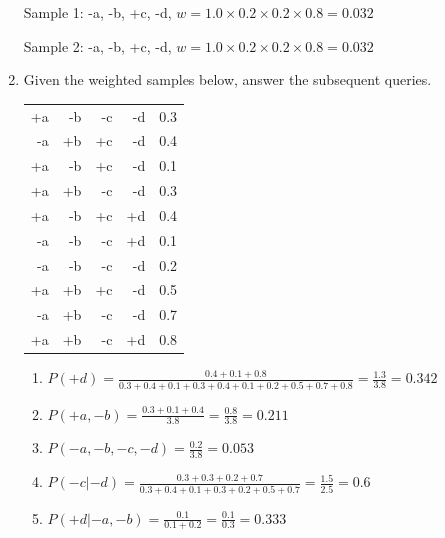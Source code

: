 \documentclass[12pt]{article}
\begin{document}
\begin{enumerate}
Sample 1: -a, -b, +c, -d, $w= 1.0\times 0.2 \times 0.2 \times 0.8 = 0.032$

Sample 2: -a, -b, +c, -d, $w= 1.0\times 0.2 \times 0.2 \times 0.8 = 0.032$

\item Given the weighted samples below, answer the subsequent queries.

\begin{flushleft}
\begin{tabular}{rrrrr} 
+a & -b & -c & -d & 0.3 \\
-a & +b & +c & -d & 0.4 \\
+a & -b & +c & -d & 0.1 \\
+a & +b & -c & -d & 0.3 \\
+a & -b & +c & +d & 0.4 \\
-a & -b & -c & +d & 0.1 \\
-a & -b & -c & -d & 0.2 \\
+a & +b & +c & -d & 0.5 \\
-a & +b & -c & -d & 0.7 \\
+a & +b & -c & +d & 0.8 \\
\end{tabular}
\end{flushleft}

\begin{enumerate}

  \item $P(+d) = \frac{0.4+0.1+0.8}{0.3+0.4+0.1+0.3+0.4+0.1+0.2+0.5+0.7+0.8} = \frac{1.3}{3.8} = 0.342$

  \item $P(+a,-b) = \frac{0.3+0.1+0.4}{3.8} = \frac{0.8}{3.8} = 0.211$

  \item $P(-a,-b,-c,-d) = \frac{0.2}{3.8} = 0.053$

  \item $P(-c | -d) = \frac{0.3+0.3+0.2+0.7}{0.3+0.4+0.1+0.3+0.2+0.5+0.7} = \frac{1.5}{2.5} = 0.6$

  \item $P(+d | -a, -b) = \frac{0.1}{0.1+0.2} = \frac{0.1}{0.3} = 0.333$

\end{enumerate}

\end{enumerate}
\end{document}
